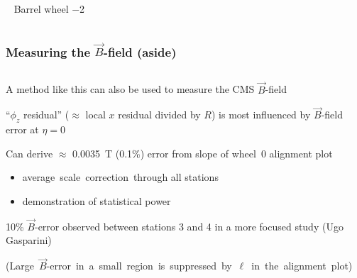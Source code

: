\documentclass[compress]{beamer}
\begin{document}
\begin{frame}
\begin{columns}
\mbox{ } \hfill \scriptsize Barrel wheel $-$2 \hfill \mbox{ }

\end{columns}
\end{frame}

\begin{frame}
\frametitle{Measuring the $\vec{B}$-field (aside)}

\vspace{0.2 cm}
\begin{columns}
\begin{minipage}{1.5\linewidth}
\begin{itemize}\setlength{\itemsep}{0.2 cm}
\item A method like this can also be used to measure the CMS $\vec{B}$-field
\item ``$\phi_z$ residual'' ($\approx$ local $x$ residual divided by $R$) is most
  influenced by $\vec{B}$-field error at $\eta=0$
\item Can derive $\approx$ 0.0035~T (0.1\%) error from slope of
  wheel~0 alignment plot

\begin{minipage}{0.65\linewidth}
\begin{itemize}
\item \mbox{average scale correction through\hspace{-2 cm}} all stations

\item demonstration of statistical power
\end{itemize}

\item 10\% $\vec{B}$-error observed between stations 3 and 4 in a more focused
  study (Ugo Gasparini)
\end{minipage}

\item \mbox{(Large $\vec{B}$-error in a small region is suppressed by $\ell$ in the alignment plot)\hspace{-8 cm}}
\end{itemize}

\end{minipage}


\end{columns}
\end{frame}
\end{document}
